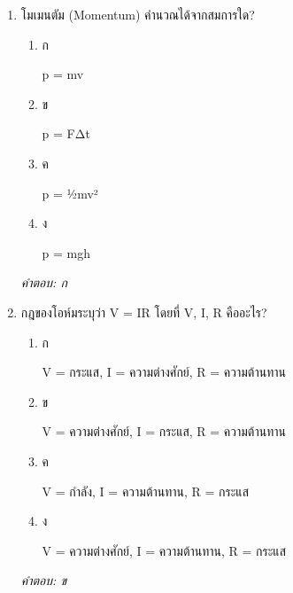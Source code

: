 \documentclass[12pt]{article}
\begin{document}
\begin{enumerate}[label=\arabic*., itemsep=0.5\baselineskip, topsep=0.5\baselineskip, leftmargin=*]
\item โมเมนตัม (Momentum) คำนวณได้จากสมการใด?
\begin{enumerate}[label=\alph*)., itemsep=0.3\baselineskip, topsep=0.3\baselineskip]
\item ก\ 
\begin{minipage}[t]{0.9\linewidth}
\raggedright p = mv
\end{minipage}
\item ข\ 
\begin{minipage}[t]{0.9\linewidth}
\raggedright p = FΔt
\end{minipage}
\item ค\ 
\begin{minipage}[t]{0.9\linewidth}
\raggedright p = ½mv²
\end{minipage}
\item ง\ 
\begin{minipage}[t]{0.9\linewidth}
\raggedright p = mgh
\end{minipage}
\end{enumerate}
\vspace{-0.3\baselineskip}
\begin{small}
\textit{คำตอบ: ก}
\end{small}

\item กฎของโอห์มระบุว่า V = IR โดยที่ V, I, R คืออะไร?
\begin{enumerate}[label=\alph*)., itemsep=0.3\baselineskip, topsep=0.3\baselineskip]
\item ก\ 
\begin{minipage}[t]{0.9\linewidth}
\raggedright V = กระแส, I = ความต่างศักย์, R = ความต้านทาน
\end{minipage}
\item ข\ 
\begin{minipage}[t]{0.9\linewidth}
\raggedright V = ความต่างศักย์, I = กระแส, R = ความต้านทาน
\end{minipage}
\item ค\ 
\begin{minipage}[t]{0.9\linewidth}
\raggedright V = กำลัง, I = ความต้านทาน, R = กระแส
\end{minipage}
\item ง\ 
\begin{minipage}[t]{0.9\linewidth}
\raggedright V = ความต่างศักย์, I = ความต้านทาน, R = กระแส
\end{minipage}
\end{enumerate}
\vspace{-0.3\baselineskip}
\begin{small}
\textit{คำตอบ: ข}
\end{small}


\end{enumerate}
\end{document}
